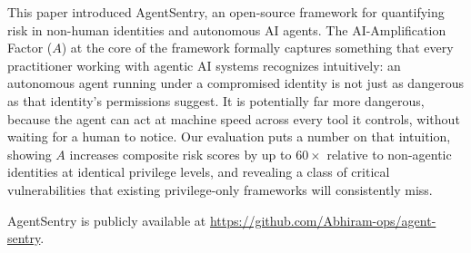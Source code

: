 \documentclass[conference]{IEEEtran}
\begin{document}
This paper introduced AgentSentry, an open-source framework for quantifying
risk in non-human identities and autonomous AI agents. The AI-Amplification
Factor ($A$) at the core of the framework formally captures something that
every practitioner working with agentic AI systems recognizes intuitively: an
autonomous agent running under a compromised identity is not just as dangerous
as that identity's permissions suggest. It is potentially far more dangerous,
because the agent can act at machine speed across every tool it controls,
without waiting for a human to notice. Our evaluation puts a number on that
intuition, showing $A$ increases composite risk scores by up to $60\times$
relative to non-agentic identities at identical privilege levels, and revealing
a class of critical vulnerabilities that existing privilege-only frameworks
will consistently miss.

AgentSentry is publicly available at
\url{https://github.com/Abhiram-ops/agent-sentry}.
\end{document}
